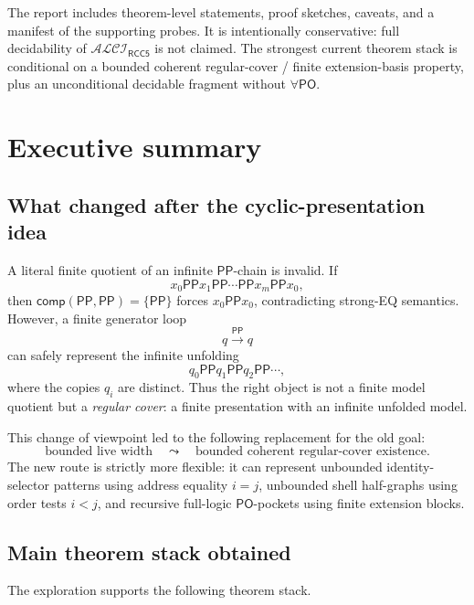 \documentclass[11pt]{article}
\newcommand{\PP}{\mathsf{PP}}
\newcommand{\PO}{\mathsf{PO}}
\newcommand{\comp}{\mathsf{comp}}
\newcommand{\ALCI}{\mathcal{ALCI}_{\mathsf{RCC5}}}
\begin{document}
The report includes theorem-level statements, proof sketches, caveats, and a manifest of the supporting probes.  It is intentionally conservative: full decidability of $\ALCI$ is not claimed.  The strongest current theorem stack is conditional on a bounded coherent regular-cover / finite extension-basis property, plus an unconditional decidable fragment without $\forall\PO$.

\section{Executive summary}

\subsection{What changed after the cyclic-presentation idea}
A literal finite quotient of an infinite $\PP$-chain is invalid.  If
\[
x_0\PP x_1\PP \cdots \PP x_m\PP x_0,
\]
then $\comp(\PP,\PP)=\{\PP\}$ forces $x_0\PP x_0$, contradicting strong-EQ semantics.  However, a finite generator loop
\[
q\xrightarrow{\PP}q
\]
can safely represent the infinite unfolding
\[
q_0\PP q_1\PP q_2\PP\cdots,
\]
where the copies $q_i$ are distinct.  Thus the right object is not a finite model quotient but a \emph{regular cover}: a finite presentation with an infinite unfolded model.

This change of viewpoint led to the following replacement for the old goal:
\[
\text{bounded live width}
\quad\leadsto\quad
\text{bounded coherent regular-cover existence}.
\]
The new route is strictly more flexible: it can represent unbounded identity-selector patterns using address equality $i=j$, unbounded shell half-graphs using order tests $i<j$, and recursive full-logic $\PO$-pockets using finite extension blocks.

\subsection{Main theorem stack obtained}
The exploration supports the following theorem stack.
\end{document}
